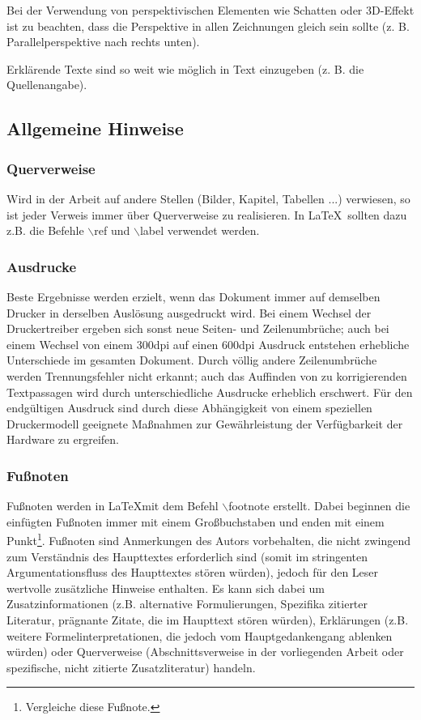 \documentclass[11pt]{scrartcl}
\begin{document}
Bei der Verwendung von perspektivischen Elementen wie Schatten oder 3D-Effekt ist zu beachten, dass die Perspektive in allen Zeichnungen gleich sein sollte (z. B. Parallelperspektive nach rechts unten).

Erklärende Texte sind so weit wie möglich in Text einzugeben (z. B. die Quellenangabe).
 
\subsection{Allgemeine Hinweise}
\subsubsection{Querverweise}
Wird in der Arbeit auf andere Stellen (Bilder, Kapitel, Tabellen ...) verwiesen, so ist jeder Verweis immer über Querverweise zu realisieren. In \LaTeX\  sollten dazu z.B. die Befehle $\backslash$ref und $\backslash$label verwendet werden.

\subsubsection{Ausdrucke}
Beste Ergebnisse werden erzielt, wenn das Dokument immer auf demselben Drucker in derselben Auslösung ausgedruckt wird. Bei einem Wechsel der Druckertreiber ergeben sich sonst neue Seiten- und Zeilenumbrüche; auch bei einem Wechsel von einem 300dpi auf einen 600dpi Ausdruck entstehen erhebliche Unterschiede im gesamten Dokument. Durch völlig andere Zeilenumbrüche werden Trennungsfehler nicht erkannt; auch das Auffinden von zu korrigierenden Textpassagen wird durch unterschiedliche Ausdrucke erheblich erschwert. Für den endgültigen Ausdruck sind durch diese Abhängigkeit von einem speziellen Druckermodell geeignete Maßnahmen zur Gewährleistung der Verfügbarkeit  der Hardware zu ergreifen.

\subsubsection{Fußnoten}
Fußnoten werden in \LaTeX mit dem Befehl $\backslash$footnote erstellt. Dabei beginnen die einfügten Fußnoten immer mit einem Großbuchstaben und enden mit einem Punkt\footnote{Vergleiche diese Fußnote.}. Fußnoten sind Anmerkungen des Autors vorbehalten, die nicht zwingend zum Verständnis des Haupttextes erforderlich sind (somit im stringenten Argumentationsfluss des Haupttextes stören würden), jedoch für den Leser wertvolle zusätzliche Hinweise enthalten. Es kann sich dabei um Zusatzinformationen (z.B. alternative Formulierungen, Spezifika zitierter Literatur, prägnante Zitate, die im Haupttext stören würden), Erklärungen (z.B. weitere Formelinterpretationen, die jedoch vom Hauptgedankengang ablenken würden) oder Querverweise (Abschnittsverweise in der vorliegenden Arbeit oder spezifische, nicht zitierte Zusatzliteratur) handeln.
\end{document}
